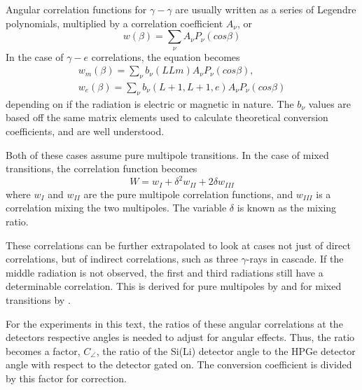 

Angular correlation functions for $\gamma-\gamma$ are usually written as a series of Legendre polynomials, multiplied by a correlation coefficient $A_\nu$, or
\begin{equation}
    w(\beta) = \sum_\nu A_\nu P_\nu(cos\beta)
    \label{eq:ge_corr}
\end{equation}
In the case of $\gamma-e$ correlations, the equation becomes 
\begin{equation}
    \begin{split}
        w_m(\beta) = \sum_\nu b_\nu(LLm) A_\nu P_\nu(cos\beta), \\
        w_e(\beta) = \sum_\nu b_\nu(L+1,L+1,e) A_\nu P_\nu(cos\beta)
        \label{eq:e_corr}
    \end{split}
\end{equation}
depending on if the radiation is electric or magnetic in nature. The $b_\nu$ values are based off the same matrix elements used to calculate theoretical conversion coefficients, and are well understood\citep{rose51:_internal_conversion, rose52:_internal_conversion}.

Both of these cases assume pure multipole transitions. In the case of mixed transitions, the correlation function becomes
\begin{equation}
    W = w_I + \delta^2 w_{II} + 2\delta w_{III}
    \label{eq:mixed_corr}
\end{equation}
where $w_I$ and $w_{II}$ are the pure multipole correlation functions, and $w_{III}$ is a correlation mixing the two multipoles. The variable $\delta$ is known as the mixing ratio. 

These correlations can be further extrapolated to look at cases not just of direct correlations, but of indirect correlations, such as three $\gamma$-rays in cascade. If the middle radiation is not observed, the first and third radiations still have a determinable correlation. This is derived for pure multipoles by \citep{biedenharn53:_theory_angular_corr} and for mixed transitions by \citep{rose53:_angular_corr_supp,osborn53:_angular_corr_3}.

For the experiments in this text, the ratios of these angular correlations at the detectors respective angles is needed to adjust for angular effects. Thus, the ratio becomes a factor, $C_{\angle}$, the ratio of the Si(Li) detector angle to the HPGe detector angle with respect to the detector gated on. The conversion coefficient is divided by this factor for correction.

